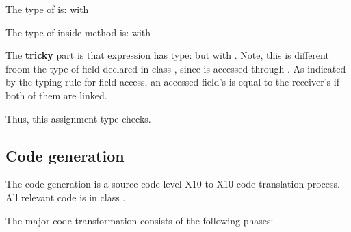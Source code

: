 \documentclass{article}
\begin{document}
\begin{enumerate}
The type of  is:  with 

The type of  inside method 
is:  with 

The \textbf{tricky} part is that expression  has type:  but with . Note, this is different froom the type of field  declared in class , since  is accessed through . As indicated by the typing rule for field access, an accessed field's  is equal to the receiver's  if both of them are linked.

Thus, this assignment  type checks.


\end{enumerate}



\subsection{Code generation}
\label{sec:codegen}

The code generation is a source-code-level X10-to-X10 code translation process. All relevant code is in class .

The major code transformation consists of the following phases:
\end{document}
